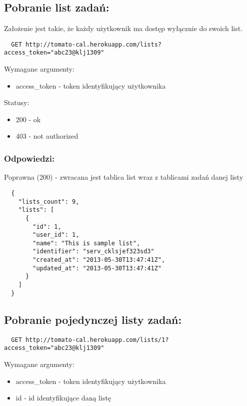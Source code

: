 \subsection{Pobranie list zadań:}

Założenie jest takie, że każdy użytkownik ma dostęp wyłącznie do swoich list.

\begin{lstlisting}
  GET http://tomato-cal.herokuapp.com/lists?access_token="abc23@klj1309"
\end{lstlisting}

Wymagane argumenty:

\begin{itemize}
  \item access\_token - token identyfikujący użytkownika
\end{itemize}

Statusy:
\begin{itemize}
  \item 200 - ok
  \item 403 - not authorized
\end{itemize}


\subsubsection{Odpowiedzi:}


Poprawna (200) - zwracana jest tablica list wraz z tablicami zadań danej listy
\begin{lstlisting}
  {
    "lists_count": 9,
    "lists": [
      {
        "id": 1,
        "user_id": 1,
        "name": "This is sample list",
        "identifier": "serv_cklsjef323sd3"
        "created_at": "2013-05-30T13:47:41Z",
        "updated_at": "2013-05-30T13:47:41Z"
      }
    ]
  }
\end{lstlisting}

\subsection{Pobranie pojedynczej listy zadań:}

\begin{lstlisting}
  GET http://tomato-cal.herokuapp.com/lists/1?access_token="abc23@klj1309"
\end{lstlisting}

Wymagane argumenty:
\begin{itemize}
  \item access\_token - token identyfikujący użytkownika
  \item id - id identyfikujące daną listę
\end{itemize}


